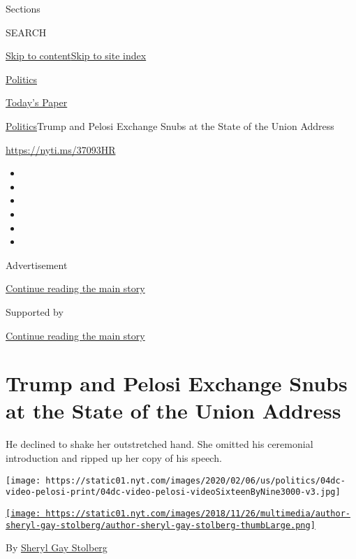 Sections

SEARCH

\protect\hyperlink{site-content}{Skip to
content}\protect\hyperlink{site-index}{Skip to site index}

\href{https://www.nytimes.com/section/politics}{Politics}

\href{https://myaccount.nytimes.com/auth/login?response_type=cookie\&client_id=vi}{}

\href{https://www.nytimes.com/section/todayspaper}{Today's Paper}

\href{/section/politics}{Politics}\textbar{}Trump and Pelosi Exchange
Snubs at the State of the Union Address

\url{https://nyti.ms/37093HR}

\begin{itemize}
\item
\item
\item
\item
\item
\item
\end{itemize}

Advertisement

\protect\hyperlink{after-top}{Continue reading the main story}

Supported by

\protect\hyperlink{after-sponsor}{Continue reading the main story}

\hypertarget{trump-and-pelosi-exchange-snubs-at-the-state-of-the-union-address}{%
\section{Trump and Pelosi Exchange Snubs at the State of the Union
Address}\label{trump-and-pelosi-exchange-snubs-at-the-state-of-the-union-address}}

He declined to shake her outstretched hand. She omitted his ceremonial
introduction and ripped up her copy of his speech.

\texttt{[image: https://static01.nyt.com/images/2020/02/06/us/politics/04dc-video-pelosi-print/04dc-video-pelosi-videoSixteenByNine3000-v3.jpg]}

\href{https://www.nytimes.com/by/sheryl-gay-stolberg}{\texttt{[image: https://static01.nyt.com/images/2018/11/26/multimedia/author-sheryl-gay-stolberg/author-sheryl-gay-stolberg-thumbLarge.png]}}

By \href{https://www.nytimes.com/by/sheryl-gay-stolberg}{Sheryl Gay
Stolberg}

